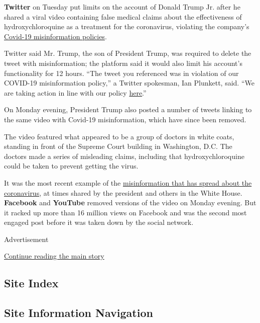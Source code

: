 \textbf{Twitter} on Tuesday put limits on the account of Donald Trump
Jr. after he shared a viral video containing false medical claims about
the effectiveness of hydroxychloroquine as a treatment for the
coronavirus, violating the company's
\href{https://help.twitter.com/en/rules-and-policies/notices-on-twitter}{Covid-19
misinformation policies}.

Twitter said Mr. Trump, the son of President Trump, was required to
delete the tweet with misinformation; the platform said it would also
limit his account's functionality for 12 hours. ``The tweet you
referenced was in violation of our COVID-19 misinformation policy,'' a
Twitter spokesman, Ian Plunkett, said. ``We are taking action in line
with our policy
\href{https://help.twitter.com/en/rules-and-policies/notices-on-twitter}{here}.''

On Monday evening, President Trump also posted a number of tweets
linking to the same video with Covid-19 misinformation, which have since
been removed.

The video featured what appeared to be a group of doctors in white
coats, standing in front of the Supreme Court building in Washington,
D.C. The doctors made a series of misleading claims, including that
hydroxychloroquine could be taken to prevent getting the virus.

It was the most recent example of the
\href{https://www.nytimes.com/2020/05/20/technology/plandemic-movie-youtube-facebook-coronavirus.html}{misinformation
that has spread about the coronavirus}, at times shared by the president
and others in the White House. \textbf{Facebook} and \textbf{YouTube}
removed versions of the video on Monday evening. But it racked up more
than 16 million views on Facebook and was the second most engaged post
before it was taken down by the social network.

Advertisement

\protect\hyperlink{after-bottom}{Continue reading the main story}

\hypertarget{site-index}{%
\subsection{Site Index}\label{site-index}}

\hypertarget{site-information-navigation}{%
\subsection{Site Information
Navigation}\label{site-information-navigation}}

